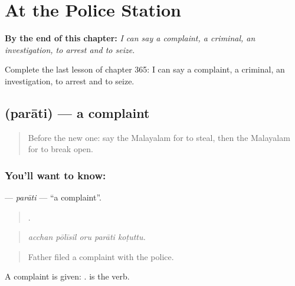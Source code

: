 
\chapter{At the Police Station}
\label{ch:ml-at-the-police-station}

\begin{chapteropening}
\textbf{By the end of this chapter:} \emph{I can say a complaint, a criminal, an investigation, to arrest and to seize.}

Complete the last lesson of chapter 365: I can say a complaint, a criminal, an investigation, to arrest and to seize.
\end{chapteropening}

\section[\texorpdfstring{\ml{പരാതി} (parāti)}{പരാതി (parāti)}]{ (parāti) — a complaint}

\label{lesson:ML-C365-parati}



\begin{quote}
Before the new one: say the Malayalam for to steal, then the Malayalam for to break open.
\end{quote}

\subsection*{You'll want to know: }
\textbf{} — \emph{parāti} — \textquotedblleft{}a complaint\textquotedblright{}.

\begin{quote}
    .
\end{quote}

\begin{quote}
\emph{acchan pōlīsil oru parāti koṭuttu.}
\end{quote}

\begin{quote}
Father filed a complaint with the police.
\end{quote}

A complaint is given:  .  is the verb.


